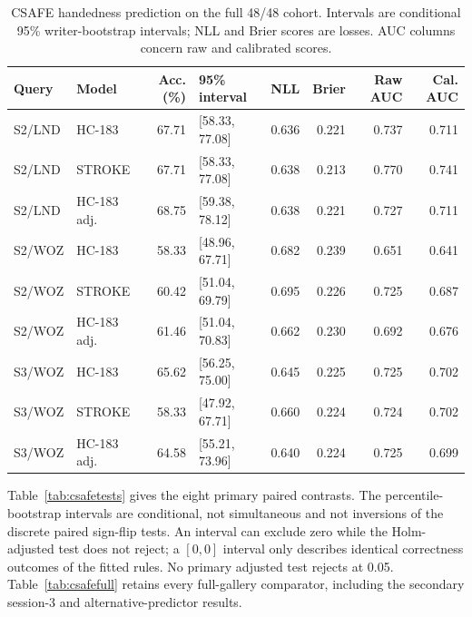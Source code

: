\documentclass[10pt,a4paper]{article}
\begin{document}
\begin{table}[ht]
\caption{CSAFE handedness prediction on the full 48/48 cohort. Intervals are conditional 95\% writer-bootstrap intervals; NLL and Brier scores are losses. AUC columns concern raw and calibrated scores.}\label{tab:csafehand}
\centering\footnotesize
\begin{tabular}{llrlrrrr}\toprule
Query & Model & Acc. (\%) & 95\% interval & NLL & Brier & Raw AUC & Cal. AUC\\\midrule
S2/LND & HC-183 & 67.71 & [58.33, 77.08] & 0.636 & 0.221 & 0.737 & 0.711 \\
S2/LND & STROKE & 67.71 & [58.33, 77.08] & 0.638 & 0.213 & 0.770 & 0.741 \\
S2/LND & HC-183 adj. & 68.75 & [59.38, 78.12] & 0.638 & 0.221 & 0.727 & 0.711 \\
S2/WOZ & HC-183 & 58.33 & [48.96, 67.71] & 0.682 & 0.239 & 0.651 & 0.641 \\
S2/WOZ & STROKE & 60.42 & [51.04, 69.79] & 0.695 & 0.226 & 0.725 & 0.687 \\
S2/WOZ & HC-183 adj. & 61.46 & [51.04, 70.83] & 0.662 & 0.230 & 0.692 & 0.676 \\
S3/WOZ & HC-183 & 65.62 & [56.25, 75.00] & 0.645 & 0.225 & 0.725 & 0.702 \\
S3/WOZ & STROKE & 58.33 & [47.92, 67.71] & 0.660 & 0.224 & 0.724 & 0.702 \\
S3/WOZ & HC-183 adj. & 64.58 & [55.21, 73.96] & 0.640 & 0.224 & 0.725 & 0.699 \\
\bottomrule
\end{tabular}
\end{table}

Table~\ref{tab:csafetests} gives the eight primary paired contrasts. The percentile-bootstrap intervals are conditional, not simultaneous and not inversions of the discrete paired sign-flip tests. An interval can exclude zero while the Holm-adjusted test does not reject; a $[0,0]$ interval only describes identical correctness outcomes of the fitted rules. No primary adjusted test rejects at 0.05. Table~\ref{tab:csafefull} retains every full-gallery comparator, including the secondary session-3 and alternative-predictor results.
\end{document}
